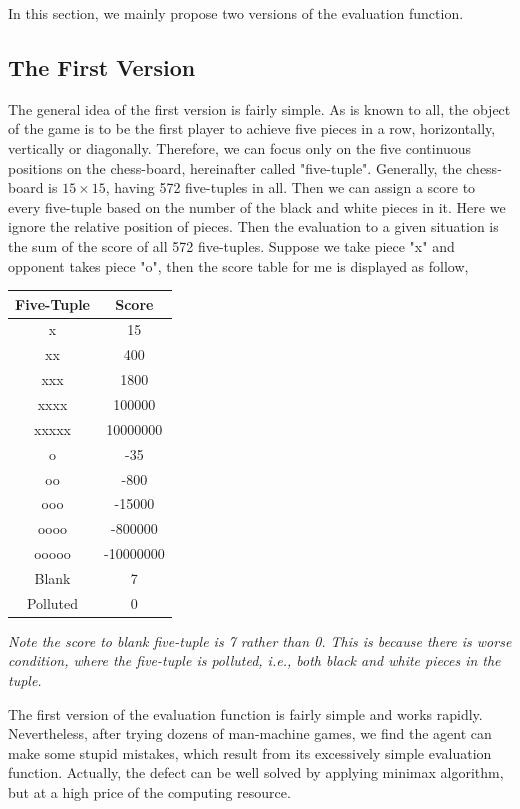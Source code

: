 \documentclass[11pt,a4paper]{article}
\begin{document}
In this section, we mainly propose two versions of the evaluation function.

\subsection{The First Version}
The general idea of the first version is fairly simple. As is known to all, the object of the game is to be the first player to achieve five pieces in a row, horizontally, vertically or diagonally. Therefore, we can focus only on the five continuous positions on the chess-board, hereinafter called "five-tuple". Generally, the chess-board is $15\times 15$, having 572 five-tuples in all. Then we can assign a score to every five-tuple based on the number of the black and white pieces in it. Here we ignore the relative position of pieces. Then the evaluation to a given situation is the sum of the score of all 572 five-tuples. Suppose we take piece "x" and opponent takes piece "o", then the score table for me is displayed as follow,
\begin{table}[h]
\centering
\begin{tabular}{c|c}
\hline
Five-Tuple&Score \\
\hline
x&15\\
xx&400\\
xxx&1800\\
xxxx&100000\\
xxxxx&10000000\\
o&-35\\
oo&-800\\
ooo&-15000\\
oooo&-800000\\
ooooo&-10000000\\
Blank&7\\
Polluted&0\\
\hline
\end{tabular}
\end{table}

\noindent\begin{small}\emph{Note the score to blank five-tuple is 7 rather than 0. This is because there is worse condition, where the five-tuple is polluted, i.e., both black and white pieces in the tuple.}\end{small}

The first version of the evaluation function is fairly simple and works rapidly. Nevertheless, after trying dozens of man-machine games, we find the agent can make some stupid mistakes, which result from its excessively simple evaluation function. Actually, the defect can be well solved by applying minimax algorithm, but at a high price of the computing resource.
\end{document}
